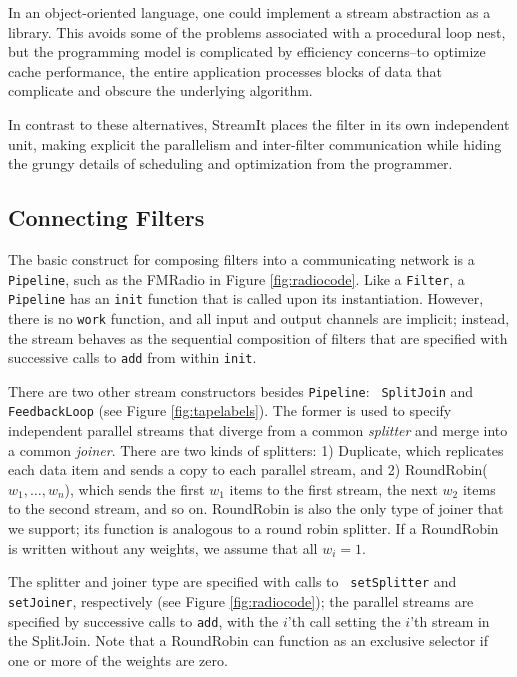 In an object-oriented language, one could implement a stream
abstraction as a library.  This avoids some of the problems associated
with a procedural loop nest, but the programming model is complicated
by efficiency concerns--to optimize cache performance, the entire
application processes blocks of data that complicate and obscure the
underlying algorithm.

In contrast to these alternatives, StreamIt places the filter in its
own independent unit, making explicit the parallelism and inter-filter
communication while hiding the grungy details of scheduling and
optimization from the programmer.

\subsection{Connecting Filters}
\label{sec:connecting}

The basic construct for composing filters into a communicating network
is a {\tt Pipeline}, such as the FMRadio in Figure
\ref{fig:radiocode}.  Like a {\tt Filter}, a {\tt Pipeline} has an
{\tt init} function that is called upon its instantiation.  However,
there is no {\tt work} function, and all input and output channels are
implicit; instead, the stream behaves as the sequential composition of
filters that are specified with successive calls to {\tt add} from
within {\tt init}.

There are two other stream constructors besides {\tt Pipeline}: {\tt
SplitJoin} and {\tt FeedbackLoop} (see Figure \ref{fig:tapelabels}).
The former is used to specify independent parallel streams that
diverge from a common {\it splitter} and merge into a common {\it
joiner}.  There are two kinds of splitters: 1) Duplicate, which
replicates each data item and sends a copy to each parallel stream,
and 2) RoundRobin($w_1, \dots, w_n$), which sends the first $w_1$
items to the first stream, the next $w_2$ items to the second stream,
and so on.  RoundRobin is also the only type of joiner that we
support; its function is analogous to a round robin splitter.  If a
RoundRobin is written without any weights, we assume that all $w_i =
1$.

The splitter and joiner type are specified with calls to {\tt
setSplitter} and {\tt setJoiner}, respectively (see Figure
\ref{fig:radiocode}); the parallel streams are specified by successive calls
to {\tt add}, with the $i$'th call setting the $i$'th stream in the
SplitJoin.  Note that a RoundRobin can function as an exclusive
selector if one or more of the weights are zero.

